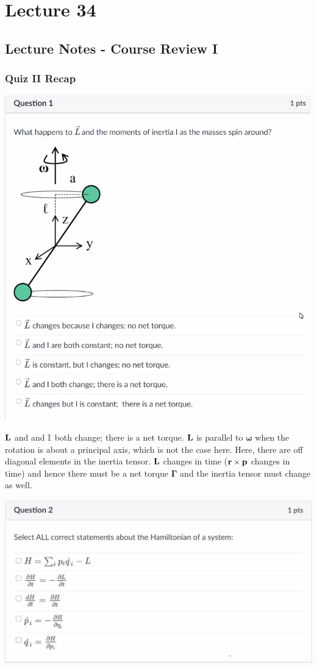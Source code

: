 \documentclass[../PHYS306Notes.tex]{subfiles}
\begin{document}
\section{Lecture 34}
\subsection{Lecture Notes - Course Review I}
\subsubsection{Quiz II Recap}
\phantom{i}
\begin{center}
    \includegraphics[scale=0.7]{Lecture-34/l34-img1.png}
\end{center}
\begin{s}
$\mathbf{L}$ and and $\mathbb{I}$ both change; there is a net torque. $\mathbf{L}$ is parallel to $\bm{\omega}$ when the rotation is about a principal axis, which is not the case here. Here, there are off diagonal elements in the inertia tensor. $\mathbf{L}$ changes in time ($\mathbf{r} \times \mathbf{p}$ changes in time) and hence there must be a net torque $\bm{\Gamma}$ and the inertia tensor must change as well.
\end{s}
\begin{center}
    \includegraphics[scale=0.7]{Lecture-34/l34-img2.png}
\end{center}
\end{document}
